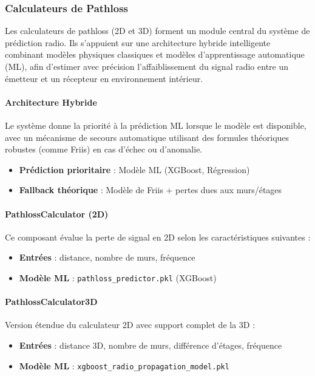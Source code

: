 \documentclass[12pt,a4paper]{article}
\begin{document}
\subsubsection{Calculateurs de Pathloss}

Les calculateurs de pathloss (2D et 3D) forment un module central du système de prédiction radio. Ils s'appuient sur une architecture hybride intelligente combinant modèles physiques classiques et modèles d'apprentissage automatique (ML), afin d’estimer avec précision l’affaiblissement du signal radio entre un émetteur et un récepteur en environnement intérieur.

\paragraph{Architecture Hybride}
Le système donne la priorité à la prédiction ML lorsque le modèle est disponible, avec un mécanisme de secours automatique utilisant des formules théoriques robustes (comme Friis) en cas d’échec ou d’anomalie.

\begin{itemize}
    \item \textbf{Prédiction prioritaire} : Modèle ML (XGBoost, Régression)
    \item \textbf{Fallback théorique} : Modèle de Friis + pertes dues aux murs/étages
\end{itemize}

\paragraph{PathlossCalculator (2D)}
Ce composant évalue la perte de signal en 2D selon les caractéristiques suivantes :
\begin{itemize}
    \item \textbf{Entrées} : distance, nombre de murs, fréquence
    \item \textbf{Modèle ML} : \texttt{pathloss\_predictor.pkl} (XGBoost)
\end{itemize}

\paragraph{PathlossCalculator3D}
Version étendue du calculateur 2D avec support complet de la 3D :
\begin{itemize}
    \item \textbf{Entrées} : distance 3D, nombre de murs, différence d'étages, fréquence
    \item \textbf{Modèle ML} : \texttt{xgboost\_radio\_propagation\_model.pkl}
\end{itemize}
\end{document}
